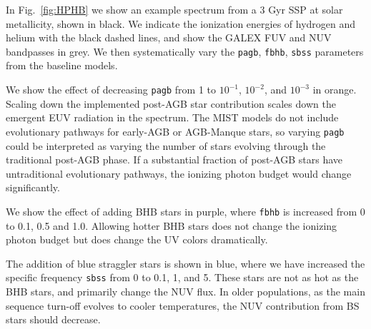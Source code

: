 In Fig.~\ref{fig:HPHB} we show an example spectrum from a 3 Gyr SSP at solar metallicity, shown in black. We indicate the ionization energies of hydrogen and helium with the black dashed lines, and show the GALEX FUV and NUV bandpasses in grey. We then systematically vary the {\tt pagb}, {\tt fbhb}, {\tt sbss} parameters from the baseline models.

We show the effect of decreasing {\tt pagb} from 1 to $10^{-1}$, $10^{-2}$, and $10^{-3}$ in orange. Scaling down the implemented post-AGB star contribution scales down the emergent EUV radiation in the spectrum. The MIST models do not include evolutionary pathways for early-AGB or AGB-Manque stars, so varying {\tt pagb} could be interpreted as varying the number of stars evolving through the traditional post-AGB phase. If a substantial fraction of post-AGB stars have untraditional evolutionary pathways, the ionizing photon budget would change significantly.

We show the effect of adding BHB stars in purple, where {\tt fbhb} is increased from 0 to 0.1, 0.5 and 1.0. Allowing hotter BHB stars does not change the ionizing photon budget but does change the UV colors dramatically. 

The addition of blue straggler stars is shown in blue, where we have increased the specific frequency {\tt sbss} from 0 to 0.1, 1, and 5. These stars are not as hot as the BHB stars, and primarily change the NUV flux. In older populations, as the main sequence turn-off evolves to cooler temperatures, the NUV contribution from BS stars should decrease.


